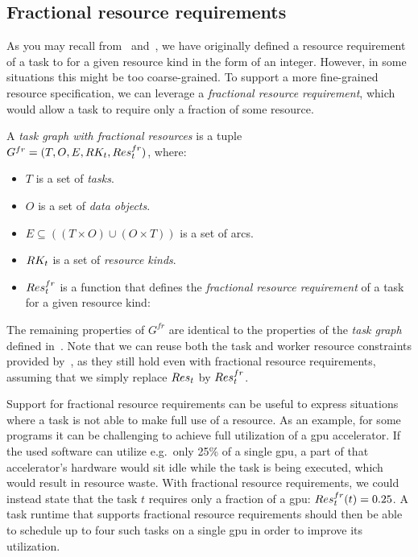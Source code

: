 \subsection{Fractional resource requirements}
As you may recall from~ and~, we have originally
defined a resource requirement of a task to for a given resource kind in the form of an integer.
However, in some situations this might be too coarse-grained. To support a more fine-grained
resource specification, we can leverage a \emph{fractional resource requirement}, which would allow a task to
require only a fraction of some resource.

\vspace{2mm} A
\emph{task graph with fractional resources} is a tuple \\
$G^{fr} = (T, O, E, RK_t, Res_t^{fr})$, where:
\begin{itemize}[itemsep=0pt]
	\item $T$ is a set of \emph{tasks}.
	\item $O$ is a set of \emph{data objects}.
	\item $E \subseteq ((T\times{}O) \cup (O\times{}T))$ is a set of arcs.
	\item $RK_t$ is a set of \emph{resource kinds}.
	\item $Res_t^{fr}$ is a function that defines the
	      \emph{fractional resource requirement} of a task for a given resource kind: \\
\end{itemize}

The remaining properties of $G^{fr}$ are identical to the properties of the
\emph{task graph} defined in~. Note that we can reuse both the task
and worker resource constraints provided by~, as they still
hold even with fractional resource requirements, assuming that we simply replace $Res_t$ by
$Res_t^{fr}$.

Support for fractional resource requirements can be useful to express situations where a task is
not able to make full use of a resource. As an example, for some programs it can be challenging to
achieve full utilization of a \gls{gpu} accelerator. If the used software can utilize
e.g.\ only 25\% of a single \gls{gpu}, a part of that accelerator's hardware would
sit idle while the task is being executed, which would result in resource waste. With fractional
resource requirements, we could instead state that the task $t$ requires only a
fraction of a \gls{gpu}: $Res_t^{fr}(t) = 0.25$. A task runtime that supports
fractional resource requirements should then be able to schedule up to four such tasks on a single
\gls{gpu} in order to improve its utilization.

